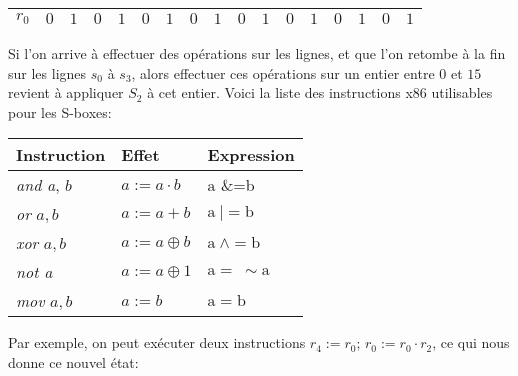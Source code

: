\documentclass{article}
\begin{document}
\begin{center}
\begin{tabular}{|l|l|l|l|l|l|l|l|l|l|l|l|l|l|l|l|l|}
\hline
\multicolumn{1}{|l|}{ $r_{0}$}&	\multicolumn{1}{|l|}{ $0$}&	\multicolumn{1}{|l|}{ $1$}&	\multicolumn{1}{|l|}{ $0$}&	\multicolumn{1}{|l|}{ $1$}&	\multicolumn{1}{|l|}{ $0$}&	\multicolumn{1}{|l|}{ $1$}&	\multicolumn{1}{|l|}{ $0$}&	\multicolumn{1}{|l|}{ $1$}&	\multicolumn{1}{|l|}{ $0$}&	\multicolumn{1}{|l|}{ $1$}&	\multicolumn{1}{|l|}{ $0$}&	\multicolumn{1}{|l|}{ $1$}&	\multicolumn{1}{|l|}{ $0$}&	\multicolumn{1}{|l|}{ $1$}&	\multicolumn{1}{|l|}{ $0$}&	\multicolumn{1}{|l|}{ $1$}	\\
\hline
\end{tabular}
\end{center}
\medbreak
 Si l'on arrive à effectuer des opérations sur les lignes, et que l'on retombe à la fin sur  les lignes $s_{0}$ à $s_{3}$, alors effectuer ces opérations sur un entier entre $0$ et $15$ revient à appliquer $S_{2}$ à cet entier. 
Voici la liste des instructions x86 utilisables pour les S-boxes:
\medbreak
\begin{center}
\begin{tabular}{|l|l|l|}
\hline
\multicolumn{1}{|l|}{Instruction}&	\multicolumn{1}{|l|}{Effet}&	\multicolumn{1}{|l|}{Expression}	\\
\hline
\multicolumn{1}{|l|}{{\it and a}, $b$}&	\multicolumn{1}{|l|}{ $a:=a\cdot b$}&	\multicolumn{1}{|l|}{ $\mathrm{a}$ \&=b}	\\
\hline
\multicolumn{1}{|l|}{{\it or} $a,b$}&	\multicolumn{1}{|l|}{ $a:=a+b$}&	\multicolumn{1}{|l|}{ $\mathrm{a}\ |=\mathrm{b}$}	\\
\hline
\multicolumn{1}{|l|}{{\it xor} $a,b$}&	\multicolumn{1}{|l|}{ $a:=a\oplus b$}&	\multicolumn{1}{|l|}{ $\mathrm{a}\ \wedge=\mathrm{b}$}	\\
\hline
\multicolumn{1}{|l|}{{\it not a}}&	\multicolumn{1}{|l|}{$a:=a\oplus 1$}&	\multicolumn{1}{|l|}{ $\mathrm{a}=\ \sim \mathrm{a}$}	\\
\hline
\multicolumn{1}{|l|}{{\it mov} $a, b$}&	\multicolumn{1}{|l|}{ $a:=b$}&	\multicolumn{1}{|l|}{ $\mathrm{a}=\mathrm{b}$}	\\
\hline
\end{tabular}
\end{center}
\medbreak
Par exemple, on peut exécuter deux instructions $r_{4} := r_{0}$; $r_{0} :=r_{0}\cdot r_{2}$, ce qui nous donne ce nouvel état:
\medbreak
\end{document}
